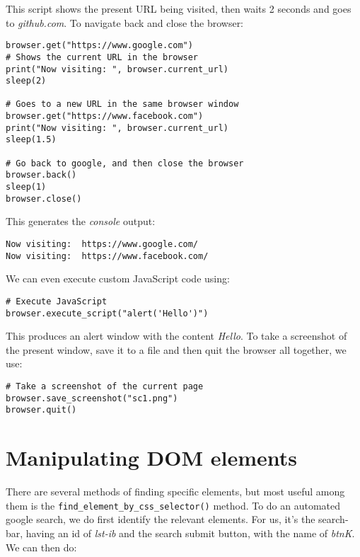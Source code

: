 \noindent
This script shows the present URL being visited, then waits 2 seconds and goes to \textit{github.com}. To navigate back and close the browser:

\vspace{-15pt}
\begin{verbatim}
browser.get("https://www.google.com")
# Shows the current URL in the browser
print("Now visiting: ", browser.current_url)
sleep(2)

# Goes to a new URL in the same browser window
browser.get("https://www.facebook.com")
print("Now visiting: ", browser.current_url)
sleep(1.5)

# Go back to google, and then close the browser
browser.back()
sleep(1)
browser.close()
\end{verbatim}
\vspace{-10pt}	

\noindent
This generates the \textit{console} output:

\vspace{-15pt}
\begin{verbatim}
Now visiting:  https://www.google.com/
Now visiting:  https://www.facebook.com/
\end{verbatim}
\vspace{-10pt}	

\noindent
We can even execute custom JavaScript code using:

\vspace{-15pt}
\begin{verbatim}
# Execute JavaScript
browser.execute_script("alert('Hello')")
\end{verbatim}
\vspace{-10pt}	

\noindent
This produces an alert window with the content \textit{Hello}. To take a screenshot of the present window, save it to a file and then quit the browser all together, we use:

\vspace{-15pt}
\begin{verbatim}
# Take a screenshot of the current page
browser.save_screenshot("sc1.png")
browser.quit()
\end{verbatim}
\vspace{-10pt}	

\section{Manipulating DOM elements}
There are several methods of finding specific elements, but most useful among them is the \verb|find_element_by_css_selector()| method. To do an automated google search, we do first identify the relevant elements. For us, it's the search-bar, having an id of \textit{lst-ib} and the search submit button, with the name of \textit{btnK}. We can then do:

